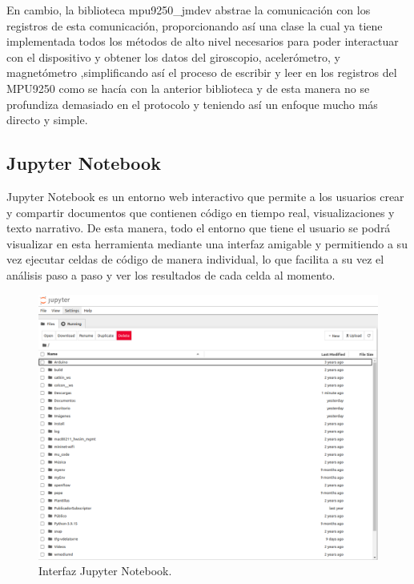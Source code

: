 En cambio, la biblioteca mpu9250\_jmdev abstrae la comunicación con los registros de esta comunicación, proporcionando así una clase la cual ya tiene implementada todos los métodos de alto nivel necesarios para poder interactuar con el dispositivo y obtener los datos del giroscopio, acelerómetro, y magnetómetro ,simplificando así el proceso de escribir y leer en los registros del MPU9250 como se hacía con la anterior biblioteca y de esta manera no se profundiza demasiado en el protocolo y teniendo así un enfoque mucho más directo y simple.

\subsection{Jupyter Notebook}
\label{subsec:Jupyter}

Jupyter Notebook es un entorno web interactivo que permite a los usuarios crear y compartir documentos que contienen código en tiempo real, visualizaciones y texto narrativo. De esta manera, todo el entorno que tiene el usuario se podrá visualizar en esta herramienta mediante una interfaz amigable y permitiendo a su vez ejecutar celdas de código de manera individual, lo que facilita a su vez el análisis paso a paso y ver los resultados de cada celda al momento.\\

\begin{figure}[H]
  \centering
  \includegraphics[scale=0.4]{figs/jup1} %
  \caption{Interfaz Jupyter Notebook.}
  \label{fig:jup1}
\end{figure}

